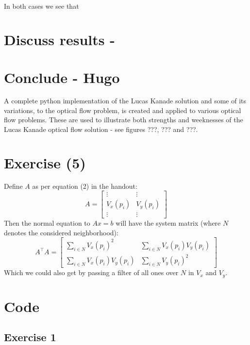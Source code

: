 \documentclass{article}
\begin{document}
In both cases we see that 

\section{Discuss results - }

\section{Conclude - Hugo}
A complete python implementation of the Lucas Kanade solution and some of its variations, to the optical flow problem, is created and applied to various optical flow problems. These are used to illustrate both strengths and weeknesses of the Lucas Kanade optical flow solution - see figures ???, ??? and ???.





\section{Exercise (5)}
Define $A$ as per equation (2) in the handout:
\begin{equation}
    A = \begin{bmatrix}
    \vdots & \vdots \\
    V_{x}(p_i) & V_{y}(p_i) \\
    \vdots & \vdots
    \end{bmatrix}
\end{equation}
Then the normal equation to $Ax = b$ will have the system matrix (where $N$ denotes the considered neighborhood):
\begin{equation}
    A^\intercal A = \begin{bmatrix}
        \sum_{i \in N} V_{x}(p_i)^{2} & \sum_{i \in N} V_{x}(p_i)V_{y}(p_i) \\
        \sum_{i \in N} V_{x}(p_i)V_{y}(p_i) & \sum_{i \in N} V_{y}(p_i)^{2}
    \end{bmatrix}
\end{equation}
Which we could also get by passing a filter of all ones over $N$ in $V_x$ and $V_y$.

\newpage
\appendix
\section{Code}
\subsection{Exercise 1}

\end{document}
